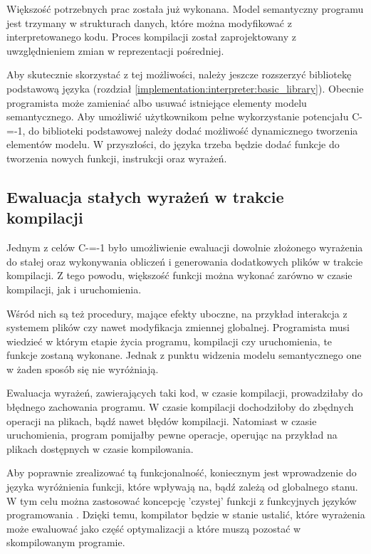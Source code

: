Większość potrzebnych prac została już wykonana.
Model semantyczny programu jest trzymany w strukturach danych, które można modyfikować z interpretowanego kodu.
Proces kompilacji został zaprojektowany z uwzględnieniem zmian w reprezentacji pośredniej.

Aby skutecznie skorzystać z tej możliwości, należy jeszcze rozszerzyć bibliotekę podstawową języka (rozdział \ref{implementation:interpreter:basic_library}).
Obecnie programista może zamieniać albo usuwać istniejące elementy modelu semantycznego.
Aby umożliwić użytkownikom pełne wykorzystanie potencjału C-=-1, do biblioteki podstawowej należy dodać możliwość dynamicznego tworzenia elementów modelu.
W przyszłości, do języka trzeba będzie dodać funkcje do tworzenia nowych funkcji, instrukcji oraz wyrażeń.

\subsection{Ewaluacja stałych wyrażeń w trakcie kompilacji}
\label{compile_time_constant_evaluation}
Jednym z celów C-=-1 było umożliwienie ewaluacji dowolnie złożonego wyrażenia do stałej oraz wykonywania obliczeń i generowania dodatkowych plików w trakcie kompilacji.
Z tego powodu, większość funkcji można wykonać zarówno w czasie kompilacji, jak i uruchomienia.

Wśród nich są też procedury, mające efekty uboczne, na przykład interakcja z systemem plików czy nawet modyfikacja zmiennej globalnej.
Programista musi wiedzieć w którym etapie życia programu, kompilacji czy uruchomienia, te funkcje zostaną wykonane.
Jednak z punktu widzenia modelu semantycznego one w żaden sposób się nie wyróżniają.

Ewaluacja wyrażeń, zawierających taki kod, w czasie kompilacji, prowadziłaby do błędnego zachowania programu.
W czasie kompilacji dochodziłoby do zbędnych operacji na plikach, bądź nawet błędów kompilacji.
Natomiast w czasie uruchomienia, program pomijałby pewne operacje, operując na przykład na plikach dostępnych w czasie kompilowania.

Aby poprawnie zrealizować tą funkcjonalność, koniecznym jest wprowadzenie do języka wyróżnienia funkcji, które wpływają na, bądź zależą od globalnego stanu.
W tym celu można zastosować koncepcję 'czystej' funkcji z funkcyjnych języków programowania \cite{McLoughlin1989ImperativeEF}.
Dzięki temu, kompilator będzie w stanie ustalić, które wyrażenia może ewaluować jako część optymalizacji a które muszą pozostać w skompilowanym programie.

